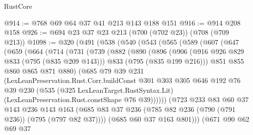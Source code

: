 \begin{lexlean}{RustCore}
\begin{coremodule}
@914 := @768 @69 @64 @37 @41 @213 @143 @188 @151
@916 := @914 @208 @158
@926 := @694 @23 @37 @23 @213 (@700 (@702 @23)) (@708 (@709 @213))
@1098 := @320
    (@491
      (@538
        (@540
          (@543
            (@565
              (@589
                (@607
                  (@647
                    (@659
                      (@664
                        (@714
                          (@731
                            (@739
                              (@882
                                (@890
                                  (@896
                                    (@906
                                      (@916 @926 @829 @833 (@795 (@835 @209 @143)))
                                      @833
                                      (@795 (@835 @199 @216)))
                                    @851
                                    @855
                                    @860
                                    @865
                                    @871
                                    @880)
                                  (@685
                                    @79
                                    @39
                                    @231
                                    (LexLeanPreservation.Rust.Corr.buildConst
                                      @301
                                      @303
                                      @305
                                      @646
                                      @192
                                      @76
                                      @39
                                      @230
                                      (@535
                                        (@325 LexLeanTarget.RustSyntax.Lit)
                                        (LexLeanPreservation.Rust.constShape @76 @39))))))
                              (@723
                                @233
                                @83
                                @60
                                @37
                                @143
                                @236
                                @143
                                @163
                                (@685
                                  @83
                                  @37
                                  @236
                                  (@785 @82 @236 (@790 (@791 @236)) (@795 (@797 @82 @37))))
                                (@685 @60 @37 @163 @801)))
                            (@671
                              @90
                              @62
                              @69
                              @37

\end{coremodule}
\end{lexlean}
